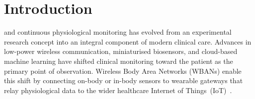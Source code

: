 \documentclass[journal,twoside,web]{IEEEtran}
\begin{document}
\IEEEpeerreviewmaketitle

\section{Introduction}
 and continuous physiological monitoring has
evolved from an experimental research concept into an integral component
of modern clinical care.  Advances in low-power wireless communication,
miniaturised biosensors, and cloud-based machine learning have shifted
clinical monitoring toward the patient as the primary point of
observation.  Wireless Body Area Networks (WBANs) enable this shift by
connecting on-body or in-body sensors to wearable gateways that relay
physiological data to the wider healthcare Internet of
Things~(IoT)~\cite{azzawi2017traffic,salayma2017wban,azzawi2022auth}.

\end{document}
